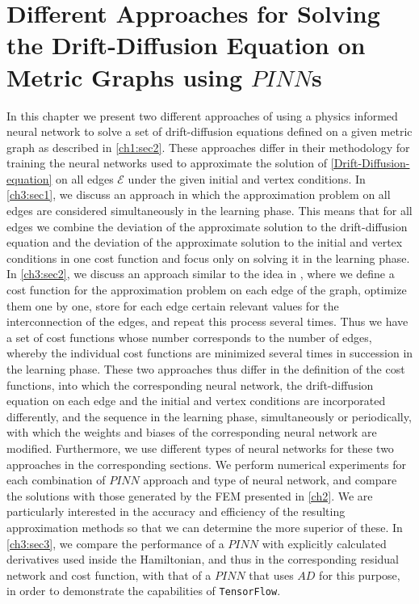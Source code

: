 \chapter{Different Approaches for Solving the Drift-Diffusion Equation on Metric Graphs using $PINN$s}

In this chapter we present two different approaches of using a physics informed neural network to solve a set of drift-diffusion equations defined on a given metric graph as described in \cref{ch1:sec2}. These approaches differ in their methodology for training the neural networks used to approximate the solution of \cref{Drift-Diffusion-equation} on all edges $\mathcal{E}$ under the given initial and vertex conditions. In \cref{ch3:sec1}, we discuss an approach in which the approximation problem on all edges are considered simultaneously in the learning phase. This means that for all edges we combine the deviation of the approximate solution to the drift-diffusion equation and the deviation of the approximate solution to the initial and vertex conditions in one cost function and focus only on solving it in the learning phase. In \cref{ch3:sec2}, we discuss an approach similar to the idea in \cite{JagtapKharazmiKarniadakis:2020}, where we define a cost function for the approximation problem on each edge of the graph, optimize them one by one, store for each edge certain relevant values for the interconnection of the edges, and repeat this process several times. Thus we have a set of cost functions whose number corresponds to the number of edges, whereby the individual cost functions are minimized several times in succession in the learning phase. These two approaches thus differ in the definition of the cost functions, into which the corresponding neural network, the drift-diffusion equation on each edge and the initial and vertex conditions are incorporated differently, and the sequence in the learning phase, simultaneously or periodically, with which the weights and biases of the corresponding neural network are modified. Furthermore, we use different types of neural networks for these two approaches in the corresponding sections. We perform numerical experiments for each combination of $PINN$ approach and type of neural network, and compare the solutions with those generated by the FEM presented in \cref{ch2}. We are particularly interested in the accuracy and efficiency of the resulting approximation methods so that we can determine the more superior of these. In \cref{ch3:sec3}, we compare the performance of a $PINN$ with explicitly calculated derivatives used inside the Hamiltonian, and thus in the corresponding residual network and cost function, with that of a $PINN$ that uses $AD$ for this purpose, in order to demonstrate the capabilities of \lstinline!TensorFlow!. \\

